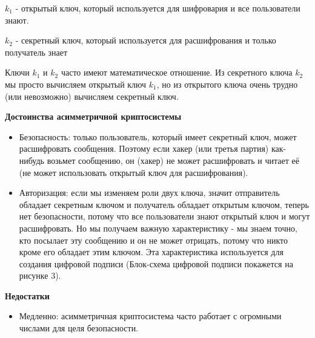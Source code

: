 $k_1$ - открытый ключ, который используется для шифровария и все пользователи знают.

$k_2$ - секретный ключ, который используется для расшифрования и только получатель знает

Ключи $k_1$ и $k_2$ часто имеют математическое отношение. Из секретного ключа $k_2$ мы просто вычисляем открытый ключ $k_1$, но из открытого ключа очень трудно (или невозможно) вычисляем секретный ключ.

\textbf{Достоинства асимметричной криптосистемы}
\begin{itemize}[label={--},noitemsep,nolistsep]
	\item Безопасность: только пользователь, который имеет секретный ключ, может расшифровать сообщения. Поэтому если хакер (или третья партия) как-нибудь возьмет сообщению, он (хакер) не может расшифровать и читает её (не может использовать открытый ключ для расшифрования).
	\item Авторизация: если мы изменяем роли двух ключа, значит отправитель обладает секретным ключом и получатель обладает открытым ключом, теперь нет безопасности, потому что все пользователи знают открытый ключ и могут расшифровать. Но мы получаем важную характеристику - мы знаем точно, кто посылает эту сообщению и он не может отрицать, потому что никто кроме его обладает этим ключом. Эта характеристика используется для создания цифровой подписи (Блок-схема цифровой подписи покажется на рисунке 3).
\end{itemize}

\textbf{Недостатки}
\begin{itemize}[label={--},noitemsep,nolistsep]
	\item Медленно: асимметричная криптосистема часто работает с огромными числами для целя безопасности.
\end{itemize}

